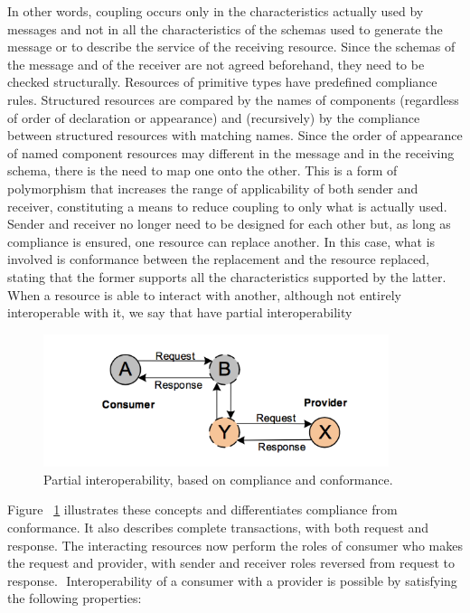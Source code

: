 In other words, coupling occurs only in the characteristics actually used by messages and not in all the characteristics of the schemas used to generate the message or to describe the service of the receiving resource. Since the schemas of
the message and of the receiver are not agreed beforehand, they need to be checked structurally. Resources of primitive
types have predefined compliance rules. Structured resources are compared by the names of components (regardless of
order of declaration or appearance) and (recursively) by the compliance between structured resources with matching
names. Since the order of appearance of named component resources may different in the message and in the receiving
schema, there is the need to map one onto the other. This is a form of polymorphism that increases the range of
applicability of both sender and receiver, constituting a means to reduce coupling to only what is actually used.
Sender and receiver no longer need to be designed for each other but, as long as compliance is ensured, one resource
can replace another. In this case, what is involved is conformance between the replacement and the resource
replaced, stating that the former supports all the characteristics supported by the latter. When a resource is able to
interact with another, although not entirely interoperable with it, we say that have partial interoperability

\begin{figure}[!htb]
  \centering
  \includegraphics[width=0.9\textwidth]{Figures/partial.png}
  \caption[Partial interoperability, based on compliance and conformance.]{Partial interoperability, based on compliance and conformance.}
  \label{fig:Partial}
\end{figure}

Figure ~\ref{fig:Partial} illustrates these concepts and differentiates compliance from conformance. It also describes complete
transactions, with both request and response. The interacting resources now perform the roles of consumer who makes the request and provider, with sender and receiver roles reversed from request to response. 
Interoperability of a consumer with a provider is possible by satisfying the following properties:

